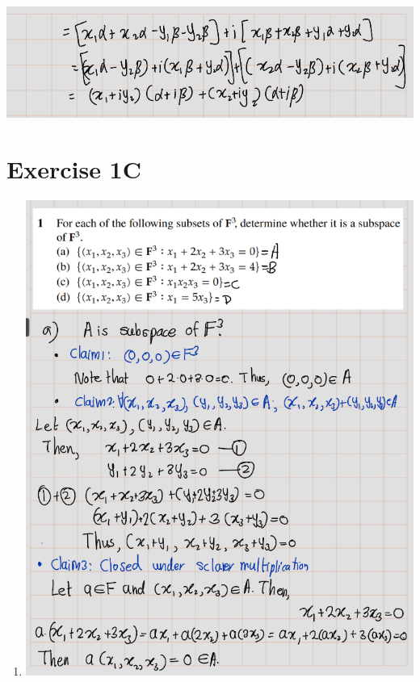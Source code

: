 \documentclass[
]{book}
\theoremstyle{definition}
\theoremstyle{definition}
\theoremstyle{definition}
\theoremstyle{definition}
\theoremstyle{remark}
\begin{document}
\includegraphics{fig/Ex1B/Ex8-5.png}

\section{Exercise 1C}\label{exercise-1c}

\begin{enumerate}
\def\labelenumi{\arabic{enumi}.}
\item
  \includegraphics{fig/Ex1C/Ex1-1.png}


\end{enumerate}
\end{document}
